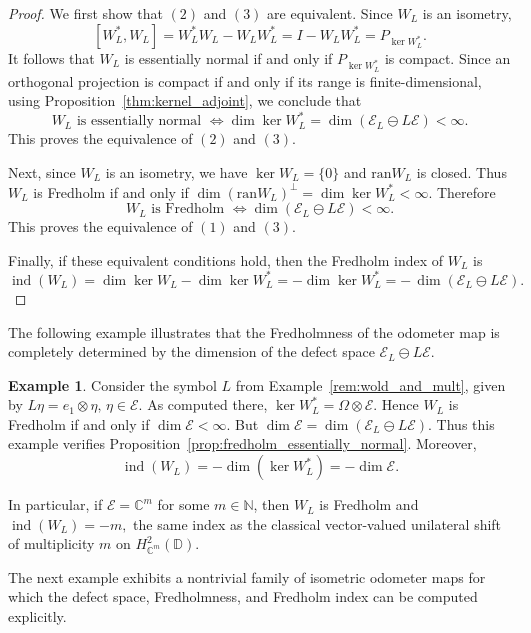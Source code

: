 \documentclass[12pt]{amsart}
\theoremstyle{definition}
\newtheorem{example}[theorem]{Example}
\theoremstyle{remark}
\def \D{\mathbb{D}}
\def \C{\mathbb{C}}
\newcommand{\cle}{\mathcal{E}}
\newcommand{\ran}{\mathrm{ran}}
\newcommand{\ind}{\operatorname{ind}}
\numberwithin{equation}{section}
\begin{document}
\begin{proof}
We first show that $(2)$ and $(3)$ are equivalent. Since $W_L$ is an isometry,
\[
[W_L^*,W_L]
=
W_L^*W_L-W_LW_L^*
=
I-W_LW_L^*
=P_{\ker W_L^*}.
\]
It follows that $W_L$ is essentially normal if and only if $P_{\ker W_L^*}$ is compact. Since an orthogonal projection is compact if and only if its range is finite-dimensional, using Proposition~\ref{thm:kernel_adjoint}, we conclude that
\[
W_L \text{ is essentially normal }
\iff
\dim\ker W_L^*=\dim(\cle_L\ominus L\cle)<\infty.
\]
This proves the equivalence of $(2)$ and $(3)$.

Next, since $W_L$ is an isometry, we have $\ker W_L=\{0\}$ and $\ran W_L$ is closed. Thus $W_L$ is Fredholm if and only if $\dim(\ran W_L)^\perp
=\dim\ker W_L^*
<\infty.$ Therefore
\[
W_L \text{ is Fredholm }
\iff
\dim(\cle_L\ominus L\cle)<\infty.
\]
This proves the equivalence of $(1)$ and $(3)$.

Finally, if these equivalent conditions hold, then the Fredholm index of $W_L$ is
\[
\ind(W_L)
=
\dim\ker W_L-\dim\ker W_L^*=
-\dim\ker W_L^*
=-\,\dim(\cle_L\ominus L\cle).
\]
\end{proof}


The following example illustrates that the Fredholmness of the odometer map is completely determined by the dimension of the defect space \(\cle_L\ominus L\cle\).



\begin{example}\label{ex:fredholm_shift_case}
Consider the symbol $L$ from Example~\ref{rem:wold_and_mult}, given by $L\eta = e_1 \otimes \eta, \, \eta \in \cle.$
As computed there, $\ker W_L^*
=
\Omega\otimes\cle.$ Hence $W_L$ is Fredholm if and only if $\dim \cle < \infty$. But  $\dim \cle=\dim(\cle_L \ominus L\cle).$ Thus this example verifies Proposition~\ref{prop:fredholm_essentially_normal}. Moreover,
\[
\ind(W_L)
=
-\dim(\ker W_L^*)
=
-\dim\cle.
\]

In particular, if $\cle=\C^m$ for some $m\in\mathbb N$, then $W_L$ is Fredholm
and $\ind(W_L)=-m,$
the same index as the classical vector-valued unilateral shift of multiplicity
\(m\) on \(H^2_{\mathbb C^m}(\D)\).
\end{example}


The next example exhibits a nontrivial family of isometric odometer maps for which the defect space, Fredholmness, and Fredholm index can be computed explicitly.
\end{document}
